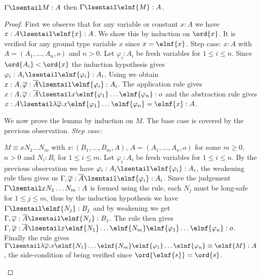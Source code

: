 \begin{lemma}
\label{lem:longsafe_imp_elnf_longsafe}
$\Gamma \lsentail M :A$ then $\Gamma \lsentail \elnf{M} :A$.
\end{lemma}
\begin{proof}
 First we observe that for any variable or constant $x:A$ we have $x:A \lsentail \elnf{x} :A$. We show this by induction on $\ord{x}$.
It is verified for any ground type variable $x$
since $x = \elnf{x}$.
Step case: $x:A$ with $A=(A_1, \ldots, A_n,o)$ and $n>0$. Let $\varphi_i:A_i$ be fresh variables for $1\leq i\leq n$.
Since $\ord{A_i} < \ord{x}$ the induction hypothesis gives $\varphi_i :A_i \lsentail \elnf{\varphi_i} : A_i$. Using  we obtain $x:A, \overline{\varphi} : \overline{A}
  \lsentail \elnf{\varphi_i} :A_i$.  The application rule gives $x :A, \overline{\varphi} : \overline{A} \lsentail x \elnf{\varphi_1} \ldots \elnf{\varphi_n}
  : o$ and the abstraction rule gives $ x :A \lsentail \lambda
  \overline{\varphi} . x \elnf{\varphi_1} \ldots \elnf{\varphi_n} =
  \elnf{x} :A$.


We now prove the lemma by induction on $M$.
The base case is covered by the previous observation.
\emph{Step case:}
\begin{compactitem}
\item $M \equiv x N_1 \ldots N_m$ with $x: (B_1, \ldots, B_m, A)$, $A = (A_1, \ldots, A_n, o)$ for some $m\geq 0$, $n>0$ and $N_i : B_i$ for $1 \leq i \leq
  m$.  Let $\varphi_i: A_i$ be fresh variables for $1\leq i \leq
  n$. By the previous observation we have $\varphi_i :A_i \lsentail \elnf{\varphi_i} :A_i$, the weakening rule then gives us $\Gamma , \overline{\varphi} : \overline{A}
  \lsentail \elnf{\varphi_i} : A_i$.  Since the judgement
  $\Gamma \lsentail x N_1 \ldots N_m : A$ is formed using the  rule, each $N_j$ must be long-safe for $1\leq j \leq m$, thus by the induction hypothesis we have $\Gamma \lsentail \elnf{N_j} : B_j$ and by weakening we get $\Gamma, \overline{\varphi} :\overline{A} \lsentail \elnf{N_j} : B_j$.  The 
  rule then gives $\Gamma, \overline{\varphi} :\overline{A} \lsentail x \elnf{N_1} \ldots \elnf{N_m} \elnf{\varphi_1} \ldots \elnf{\varphi_n} : o$. Finally
  the  rule gives $\Gamma \lsentail \lambda \overline{\varphi} . x
  \elnf{N_1} \ldots \elnf{N_m} \elnf{\varphi_1} \ldots
  \elnf{\varphi_n} \equiv \elnf{M} : A$, the side-condition of  being verified since $\ord{\elnf{s}} = \ord{s}$.



\end{compactitem}
\end{proof}
